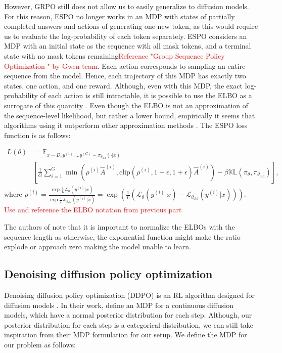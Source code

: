 However, GRPO still does not allow us to easily generalize to diffusion models. For this reason, ESPO no longer works in an MDP with states of partially completed answers and actions of generating one new token, as this would require us to evaluate the log-probability of each token separately. ESPO considers an MDP with an initial state as the sequence with all mask tokens, and a terminal state with no mask tokens remaining\textcolor{red}{Reference "Group Sequence Policy Optimization
" by Gwen team}. Each action corresponds to sampling an entire sequence from the model. Hence, each trajectory of this MDP has exactly two states, one action, and one reward. Although, even with this MDP, the exact log-probability of each action is still intractable, it is possible to use the ELBO as a surrogate of this quantity \cite{ou2025principledrldiffusionllms, rojas2025improvingreasoningdiffusionlanguage}. Even though the ELBO is not an approximation of the sequence-level likelihood, but rather a lower bound, empirically it seems that algorithms using it outperform other approximation methods \cite{ou2025principledrldiffusionllms}. The ESPO loss function is as follows:

\begin{align*}
    L(\theta) &= \mathbb{E}_{x\sim D, y^{(1)},\dots y^{(G)}\sim\pi_{\theta_\text{old}}(\cdot | x)}\\
    &[\frac{1}{G}\sum_{i=1}^{G}\min(\rho^{(i)}\hat{A}^{(i)}, \text{clip}(\rho^{(i)}, 1 - \epsilon, 1 + \epsilon)\hat{A}^{(i)}) - \beta\mathbb{KL}(\pi_\theta, \pi_{\theta_\text{old}})],
\end{align*}
where $\rho^{(i)} = \frac{\exp\frac{1}{L}\mathcal{L}_\theta(y^{(i)} | x)}{\exp\frac{1}{L}\mathcal{L}_{\theta_\text{old}}(y^{(i)} | x)} = \exp(\frac{1}{L}(\mathcal{L}_\theta(y^{(i)} | x) - \mathcal{L}_{\theta_\text{old}}(y^{(i)} | x)))$.
\textcolor{red}{Use and reference the ELBO notation from previous part}

The authors of \cite{ou2025principledrldiffusionllms} note that it is important to normalize the ELBOs with the sequence length as otherwise, the exponential function might make the ratio explode or approach zero making the model unable to learn.


\subsection{Denoising diffusion policy optimization}

Denoising diffusion policy optimization (DDPO) is an RL algorithm designed for diffusion models \cite{black2024trainingdiffusionmodelsreinforcement}. In their work, \citeauthor{black2024trainingdiffusionmodelsreinforcement} define an MDP for a continuous diffusion models, which have a normal posterior distribution for each step. Although, our posterior distribution for each step is a categorical distribution, we can still take inspiration from their MDP formulation for our setup. We define the MDP for our problem as follows:

